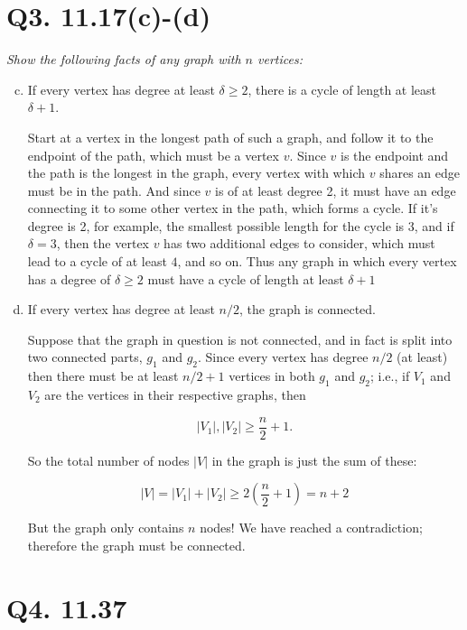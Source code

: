 \documentclass{article}
\begin{document}
\section*{Q3. 11.17(c)-(d)}

\textit{Show the following facts of any graph with $n$ vertices:}

\begin{enumerate}[(a)]\setcounter{enumi}{2}
    \item If every vertex has degree at least $\delta \geq 2$, there is a cycle of length at least $\delta + 1$.

      Start at a vertex in the longest path of such a graph, and follow it to the endpoint of the path, which must be a vertex $v$. Since $v$ is the endpoint and the path is the longest in the graph, every vertex with which $v$ shares an edge must be in the path. And since $v$ is of at least degree 2, it must have an edge connecting it to some other vertex in the path, which forms a cycle. If it's degree is 2, for example, the smallest possible length for the cycle is 3, and if $\delta = 3$, then the vertex $v$ has two additional edges to consider, which must lead to a cycle of at least $4$, and so on. Thus any graph in which every vertex has a degree of $\delta \geq 2$ must have a cycle of length at least $\delta + 1$
    \item If every vertex has degree at least $n/2$, the graph is connected.

      Suppose that the graph in question is not connected, and in fact is split into two connected parts, $g_1$ and $g_2$. Since every vertex has degree $n/2$ (at least) then there must be at least $n/2 + 1$ vertices in both $g_1$ and $g_2$; i.e., if $V_1$ and $V_2$ are the vertices in their respective graphs, then

      $$|V_1|, |V_2| \geq \frac{n}{2} + 1.$$

      So the total number of nodes $|V|$ in the graph is just the sum of these:

      $$|V| = |V_1| + |V_2| \geq 2(\frac{n}{2} + 1) = n + 2$$

      But the graph only contains $n$ nodes! We have reached a contradiction; therefore the graph must be connected.
\end{enumerate}





\section*{Q4. 11.37}
\end{document}
